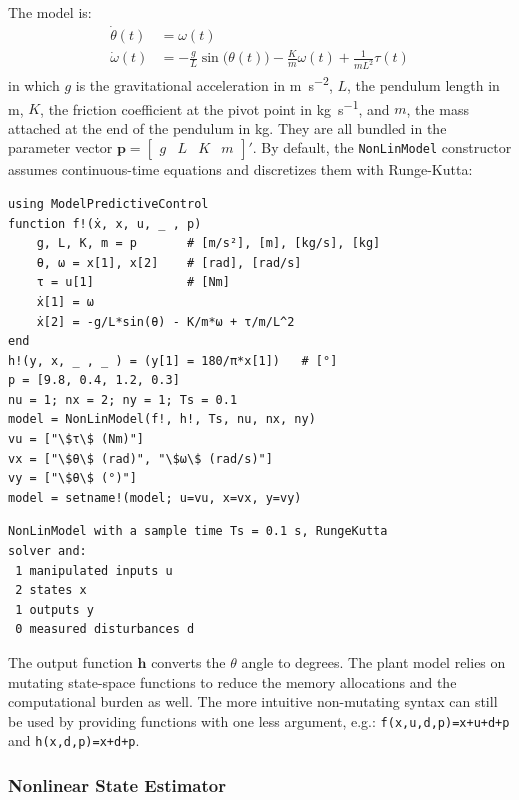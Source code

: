 The model is:
\begin{align}
\dot{\theta}(t) &= \omega(t) \\
\dot{\omega}(t) &= -\frac{g}{L}\sin\big(\theta(t)\big) -\frac{K}{m}\omega(t) + \frac{1}{m L^2}\tau(t) \label{eq.pendulum_speed}
\end{align}
in which $g$ is the gravitational acceleration in \si{\meter\per\second\squared}, $L$, the pendulum length in \si{\meter}, $K$, the friction coefficient at the pivot point in \si{\kilogram\per\second}, and $m$, the mass attached at the end of the pendulum in \si{\kilogram}. They are all bundled in the parameter vector $\mathbf{p}=[\begin{smallmatrix}g & L & K & m\end{smallmatrix}]'$. By default, the \texttt{NonLinModel} constructor assumes continuous-time equations and discretizes them with Runge-Kutta:
\begin{verbatim}
using ModelPredictiveControl
function f!(ẋ, x, u, _ , p)
    g, L, K, m = p       # [m/s²], [m], [kg/s], [kg]
    θ, ω = x[1], x[2]    # [rad], [rad/s]
    τ = u[1]             # [Nm]
    ẋ[1] = ω
    ẋ[2] = -g/L*sin(θ) - K/m*ω + τ/m/L^2
end
h!(y, x, _ , _ ) = (y[1] = 180/π*x[1])   # [°]
p = [9.8, 0.4, 1.2, 0.3]
nu = 1; nx = 2; ny = 1; Ts = 0.1
model = NonLinModel(f!, h!, Ts, nu, nx, ny)
vu = ["\$τ\$ (Nm)"]
vx = ["\$θ\$ (rad)", "\$ω\$ (rad/s)"]
vy = ["\$θ\$ (°)"]
model = setname!(model; u=vu, x=vx, y=vy)
\end{verbatim}
\spacerepl
\begin{verbatim}
NonLinModel with a sample time Ts = 0.1 s, RungeKutta
solver and:
 1 manipulated inputs u
 2 states x
 1 outputs y
 0 measured disturbances d
\end{verbatim}
The output function $\mathbf{h}$ converts the $\theta$ angle to degrees. The plant model relies on mutating state-space functions to reduce the memory allocations and the computational burden as well. The more intuitive non-mutating syntax can still be used by providing functions with one less argument, e.g.: \texttt{f(x,u,d,p)=x+u+d+p} and \texttt{h(x,d,p)=x+d+p}.

\subsubsection{Nonlinear State Estimator}

